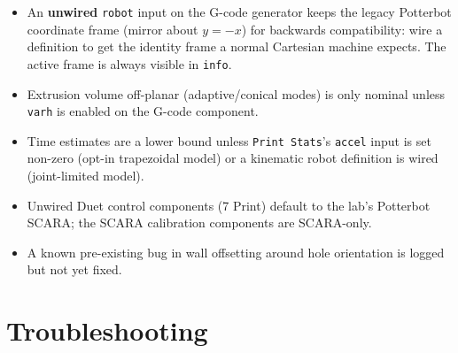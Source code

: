 \documentclass[11pt]{article}
\newcommand{\param}[1]{\texttt{#1}}
\begin{document}
\begin{itemize}
  \item An \textbf{unwired} \param{robot} input on the G-code generator keeps the legacy Potterbot coordinate frame (mirror about $y = -x$) for backwards compatibility: wire a definition to get the identity frame a normal Cartesian machine expects. The active frame is always visible in \param{info}.
  \item Extrusion volume off-planar (adaptive/conical modes) is only nominal unless \param{varh} is enabled on the G-code component.
  \item Time estimates are a lower bound unless \param{Print Stats}'s \param{accel} input is set non-zero (opt-in trapezoidal model) or a kinematic robot definition is wired (joint-limited model).
  \item Unwired Duet control components (7 Print) default to the lab's Potterbot SCARA; the SCARA calibration components are SCARA-only.
  \item A known pre-existing bug in wall offsetting around hole orientation is logged but not yet fixed.
\end{itemize}

\section{Troubleshooting}
\end{document}

